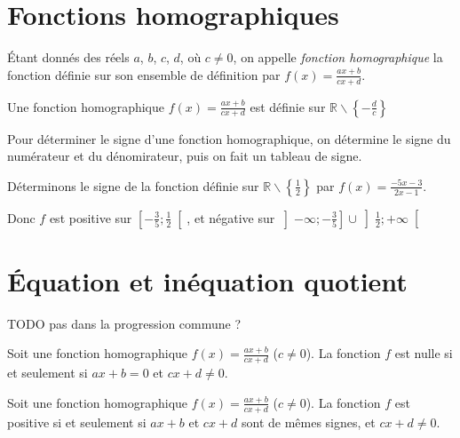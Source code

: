 \section{Fonctions homographiques}

\begin{definition}
  Étant donnés des réels $a$, $b$, $c$, $d$, où $c\neq0$, on appelle \emph{fonction homographique} la fonction définie sur son ensemble de définition par $f(x)=\frac{ax+b}{cx+d}$.
\end{definition}

\begin{propriete}
  Une fonction homographique $f(x)=\frac{ax+b}{cx+d}$ est définie sur $\mathbb{R}\backslash\left\{-\frac{d}{c}\right\}$
\end{propriete}

\begin{methode}
  Pour déterminer le signe d'une fonction homographique, on détermine le signe du numérateur et du dénomirateur, puis on fait un tableau de signe.
\end{methode}
\begin{exemple}
  Déterminons le signe de la fonction définie sur
  $\mathbb{R}\backslash\left\{\frac{1}{2}\right\}$ par
  $f(x)=\frac{-5x-3}{2x-1}$.

  \begin{center}
\end{center}
Donc $f$ est positive sur $\left[-\frac{3}{5};\frac{1}{2}\right[$, et négative sur $\left]-\infty; -\frac{3}{5}\right]\cup\left]\frac{1}{2};+\infty\right[$
\end{exemple}

\section{Équation et inéquation quotient}

TODO pas dans la progression commune ?

\begin{propriete}
  Soit une fonction homographique $f(x)=\frac{ax+b}{cx+d}$ ($c\neq0$). La fonction $f$ est nulle si et seulement si $ax+b=0$ et $cx+d\neq0$.
\end{propriete}

\begin{propriete}
  Soit une fonction homographique $f(x)=\frac{ax+b}{cx+d}$ ($c\neq0$). La fonction $f$ est positive si et seulement si $ax+b$ et $cx+d$ sont de mêmes signes, et $cx+d\neq0$.
\end{propriete}
